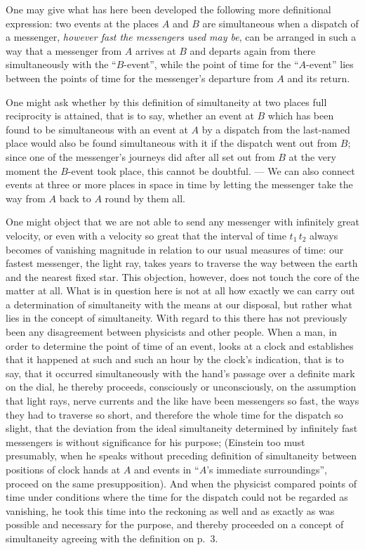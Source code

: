\documentclass[12pt,a4paper]{article}
\begin{document}
One may give what has here been developed the following more definitional
expression: two events at the places $A$ and $B$ are simultaneous when a
dispatch of a messenger, \emph{however fast the messengers used may be}, can
be arranged in such a way that a messenger from $A$ arrives at $B$ and departs
again from there simultaneously with the ``$B$-event'', while the point of
time for the ``$A$-event'' lies between the points of time for the messenger's
departure from $A$ and its return.

One might ask whether by this definition of simultaneity at two places full
reciprocity is attained, that is to say, whether an event at $B$ which has
been found to be simultaneous with an event at $A$ by a dispatch from the
last-named place would also be found simultaneous with it if the dispatch went
out from $B$; since one of the messenger's journeys did after all set out from
$B$ at the very moment the $B$-event took place, this cannot be doubtful. ---
We can also connect events at three or more places in space in time by letting
the messenger take the way from $A$ back to $A$ round by them all.

One might object that we are not able to send any messenger with infinitely
great velocity, or even with a velocity so great that the interval of time
$t_{1}\,t_{2}$ always becomes of vanishing magnitude in relation to our usual
measures of time: our fastest messenger, the light ray, takes years to
traverse the way between the earth and the nearest fixed star. This objection,
however, does not touch the core of the matter at all. What is in question
here is not at all how exactly we can carry out a determination of
simultaneity with the means at our disposal, but rather what lies in the
concept of simultaneity. With regard to this there has not previously been any
disagreement between physicists and other people. When a man, in order to
determine the point of time of an event, looks at a clock and establishes that
it happened at such and such an hour by the clock's indication, that is to
say, that it occurred simultaneously with the hand's passage over a definite
mark on the dial, he thereby proceeds, consciously or unconsciously, on the
assumption that light rays, nerve currents and the like have been messengers
so fast, the ways they had to
traverse so short, and therefore the whole time for the dispatch so slight,
that the deviation from the ideal simultaneity determined by infinitely fast
messengers is without significance for his purpose; (Einstein too must
presumably, when he speaks without preceding definition of simultaneity
between positions of clock hands at $A$ and events in ``$A$'s immediate
surroundings'', proceed on the same presupposition). And when the physicist
compared points of time under conditions where the time for the dispatch could
not be regarded as vanishing, he took this time into the reckoning as well and
as exactly as was possible and necessary for the purpose, and thereby
proceeded on a concept of simultaneity agreeing with the definition on p.~3.
\end{document}
